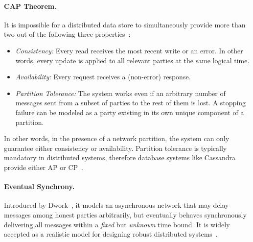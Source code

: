 \documentclass[11pt]{article}
\theoremstyle{mytheoremstyle}
\begin{document}
\paragraph{CAP Theorem.} It is impossible for a distributed data store to simultaneously provide more than two out of the following three properties~\cite{gilbert2002brewer}: 
\begin{itemize}
	\item \textit{Consistency:} Every read receives the most recent write or an error. In other words, every update is applied to all relevant parties at the same logical time.
	\item \textit{Availability:} Every request receives a (non-error) response.
	\item \textit{Partition Tolerance:} The system works even if an arbitrary number of messages sent from a subset of parties to the rest of them is lost. A stopping failure can be modeled as a party existing in its own unique component of a partition.
\end{itemize}
In other words, in the presence of a network partition, the system can only guarantee either consistency or availability. Partition tolerance is typically mandatory in distributed systems, therefore database systems like Cassandra provide either AP or CP~\cite{Howareco45:online,partition:2010}.



\paragraph{Eventual Synchrony.} Introduced by Dwork~\cite{dwork:1988:cpp}, it models an asynchronous network that may delay messages among honest parties arbitrarily, but eventually behaves synchronously delivering all messages within a \emph{fixed} but \emph{unknown} time bound. It is widely accepted as a realistic model for designing robust distributed systems~\cite{DBLP:journals/corr/CachinV17}.



\end{document}
